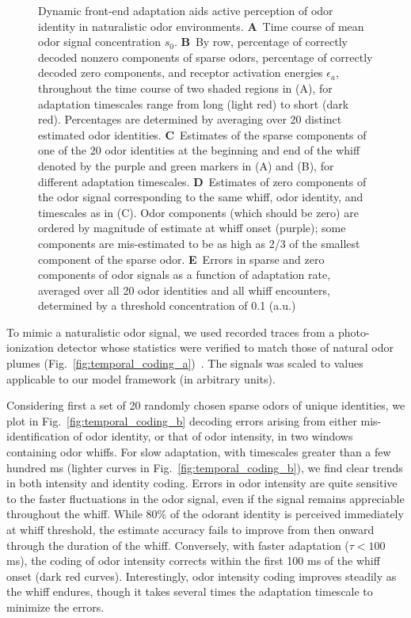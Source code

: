 \begin{figure}[!tb]
	\caption{\footnotesize{Dynamic front-end adaptation aids active perception of odor identity in naturalistic odor environments. \textbf{A}~Time course of mean odor signal concentration $s_0$. \textbf{B}~By row, percentage of correctly decoded nonzero components of sparse odors, percentage of correctly decoded zero components, and receptor activation energies $\epsilon_a$, throughout the time course of two shaded regions in (A), for adaptation timescales range from long (light red) to short (dark red). Percentages are determined by averaging over 20 distinct estimated odor identities. \textbf{C}~Estimates of the sparse components of one of the 20 odor identities at the beginning and end of the whiff denoted by the purple and green markers in (A) and (B), for different adaptation timescales. \textbf{D}~Estimates of zero components of the odor signal corresponding to the same whiff, odor identity, and timescales as in (C). Odor components (which should be zero) are ordered by magnitude of estimate at whiff onset (purple); some components are mis-estimated to be as high as 2/3 of the smallest component of the sparse odor. \textbf{E}~Errors in sparse and zero components of odor signals as a function of adaptation rate, averaged over all 20 odor identities and all whiff encounters, determined by a threshold concentration of 0.1 (a.u.)}}
	\label{fig:temporal_coding}
\end{figure}

To mimic a naturalistic odor signal, we used recorded traces from a photo-ionization detector whose statistics were verified to match those of natural odor plumes (Fig.~\ref{fig:temporal_coding_a})~\cite{celani}. The signals was scaled to values applicable to our model framework (in arbitrary units).

Considering first a set of 20 randomly chosen sparse odors of unique identities, we plot in Fig.~\ref{fig:temporal_coding_b} decoding errors arising from either mis-identification of odor identity, or that of odor intensity, in two windows containing odor whiffs. %
For slow adaptation, with timescales greater than a few hundred ms (lighter curves in Fig.~\ref{fig:temporal_coding_b}), we find clear trends in both intensity and identity coding. Errors in odor intensity are quite sensitive to the faster fluctuations in the odor signal, even if the signal remains appreciable throughout the whiff. While 80\% of the odorant identity is perceived immediately at whiff threshold, the estimate accuracy fails to improve from then onward through the duration of the whiff. Conversely, with faster adaptation ($\tau < 100$ ms), the coding of odor intensity corrects within the first 100 ms of the whiff onset (dark red curves). Interestingly, odor intensity coding improves steadily as the whiff endures, though it takes several times the adaptation timescale to minimize the errors. 



